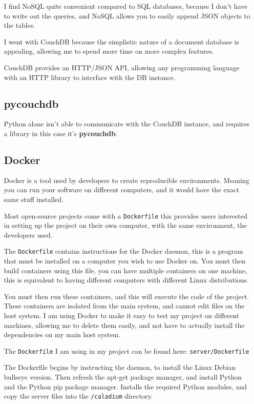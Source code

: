 I find NoSQL quite convenient compared to SQL databases,
because I don't have to write out the queries,
and NoSQL allows you to easily append JSON objects to the tables.

I went with CouchDB because the simplistic nature of a document database is appealing,
allowing me to spend more time on more complex features.

CouchDB provides an HTTP/JSON API, allowing any programming language
with an HTTP library to interface with the DB instance.

\subsection{pycouchdb}
Python alone isn't able to communicate with the CouchDB instance,
and requires a library in this case it's \textbf{pycouchdb}.

\subsection{Docker}
Docker is a tool used by developers to create reproducible environments.
Meaning you can run your software on different computers,
and it would have the exact same stuff installed.

Most open-source projects come with a \texttt{Dockerfile} this provides
users interested in setting up the project on their own computer,
with the same environment, the developers used.

The \texttt{Dockerfile} contains instructions for the Docker daemon,
this is a program that must be installed on a computer you wish to use Docker on.
You must then build containers using this file,
you can have multiple containers on one machine,
this is equivalent to having different computers with different Linux distributions.

You must then run these containers, and this will execute the code of the project.
These containers are isolated from the main system, and cannot edit files on the host system.
I am using Docker to make it easy to test my project on different machines,
allowing me to delete them easily,
and not have to actually install the dependencies on my main host system.

The \texttt{Dockerfile} I am using in my project can be found here:
\texttt{server/Dockerfile}

The Dockerfile begins by instructing the daemon,
to install the Linux Debian bullseye version.
Then refresh the apt-get package manager,
and install Python and the Python pip package manager.
Installs the required Python modules,
and copy the server files into the \texttt{/caladium} directory.

